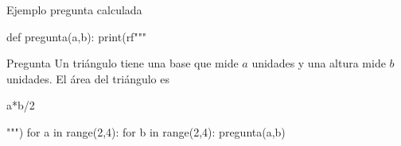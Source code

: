 \documentclass[10pt]{article}
\begin{document}
\begin{quiz}{Ejemplo pregunta calculada}

\begin{python}
def pregunta(a,b):
    print(rf"""%
\begin{{numerical}}{{Pregunta}}
    Un triángulo tiene una base que mide ${a}$ unidades y una altura mide ${b}$ unidades. El área del triángulo es
    \item {a*b/2}
\end{{numerical}}
        """)
for a in range(2,4):
    for b in range(2,4):
        pregunta(a,b)
\end{python}
\end{quiz}
\end{document}
